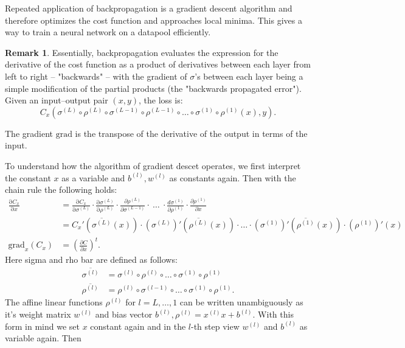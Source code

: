 \documentclass{article}
\theoremstyle{definition}
\newtheorem{remark}[theorem]{Remark}
\begin{document}
Repeated application of backpropagation is a gradient descent algorithm and therefore optimizes the cost function and approaches local minima. This gives a way to train a neural network on a datapool efficiently.

\begin{remark}
\label{com:back_prop_madness}
Essentially, backpropagation evaluates the expression for the derivative of the cost function as a product of derivatives between each layer from left to right – "backwards" – with the gradient of $\sigma$'s between each layer being a simple modification of the partial products (the "backwards propagated error").
Given an input–output pair $(x,y)$, the loss is:
$$C_{x}(\sigma^{(L)} \circ \rho^{(L)} \circ \sigma^{(L-1)} \circ \rho^{(L-1)} \circ \dots \circ \sigma^{(1)} \circ \rho^{(1)}(x), y).$$


The gradient $\text{grad}$ is the transpose of the derivative of the output in terms of the input.

To understand how the algorithm of gradient descet operates, we first interpret the constant $x$ as a variable and $b^{(l)}, w^{(l)}$ as constants again. Then with the chain rule the following holds:
\begin{align*}
\frac{\mathrm \partial C_{x}}{\mathrm \partial x} &= \frac{\mathrm \partial C_{x}}{\mathrm \partial \sigma^{(L)}} \cdot \frac{\mathrm \partial \sigma^{(L)}}{\mathrm \partial \rho^{(L)}} \cdot \frac{\partial \rho^{(L)}}{\partial \sigma^{(L-1)}} \cdot \ \ldots \ \cdot \frac{d \sigma^{(1)}}{\partial \rho^{(1)}} \cdot \frac{\partial \rho^{(1)}}{\partial x}\\
 &= C_{x}'(\overline{\sigma^{(L)}}(x)) \cdot (\sigma^{(L)})'(\overline{\rho^{(L)}}(x)) \cdot \dots \cdot (\sigma^{(1)})'(\overline{\rho^{(1)}}(x)) \cdot (\rho^{(1)})'(x) \\
\text{grad}_{x} (C_{x}) &= \left(\frac{\partial C}{\partial x}\right)^{t}.
\end{align*}
Here sigma and rho bar are defined as follows:
\begin{align*}
\overline{\sigma^{(l)}} &= \sigma^{(l)} \circ \rho^{(l)} \circ \dots \circ \sigma^{(1)} \circ \rho^{(1)} \\
\overline{\rho^{(l)}} &= \rho^{(l)} \circ \sigma^{(l-1)} \circ \dots \circ \sigma^{(1)} \circ \rho^{(1)}.
\end{align*}
The affine linear functions $\rho^{(l)}$ for $l=L, \dots , 1$ can be written unambiguously as it's weight matrix $w^{(l)}$ and bias vector $b^{(l)}, \rho^{(l)} = x^{(l)} x + b^{(l)}$. 
With this form in mind we set $x$ constant again and in the $l$-th step view $w^{(l)}$ and $b^{(l)}$ as variable again. Then


\end{remark}
\end{document}
